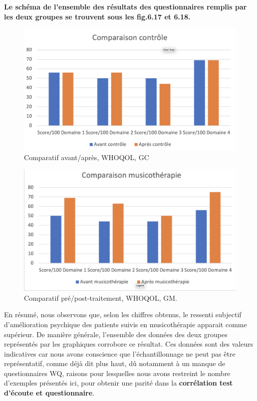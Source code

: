                \textbf{ Le schéma de l'ensemble des résultats des
                 questionnaires remplis par les deux groupes se trouvent sous les fig.6.17 et 6.18.}
                
\begin{figure}
\centering
\includegraphics[width=0.7\linewidth]{images/Compcontrole.png}
\caption[Schéma du déroulement]{Comparatif avant/après, 
  WHOQOL, GC}
       
\label{groupecontroleimage1}
\end{figure}

\begin{figure}
\centering
\includegraphics[width=0.7\linewidth]{images/Compmusico.png}
\caption[Schéma du déroulement]{Comparatif pré/post-traitement, WHOQOL, GM.}
       
\label{groupecontroleimage1}
\end{figure}



       En résumé, nous observons que, selon les chiffres obtenus, le ressenti
       subjectif d'amélioration psychique 
        des patients suivis en musicothérapie apparait comme
        supérieur.
        De manière générale, l'ensemble des données des deux groupes représentés
        par les graphiques corrobore ce résultat.
        Ces données sont des valeurs indicatives car nous avons conscience que l'échantillonnage ne
        peut pas être représentatif, comme déjà dit plus haut, dû
        notamment à un
        manque de
        questionnaires WQ, raisons pour lesquelles nous avons
        restreint le nombre d'exemples présentés ici,  pour obtenir
        une parité dans la \textbf{corrélation test d'écoute et questionnaire}.
        
